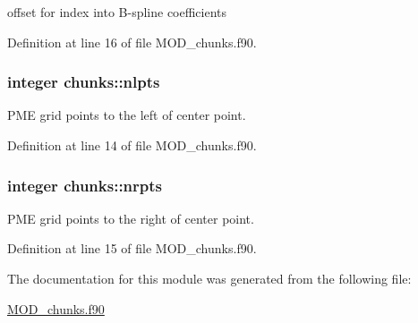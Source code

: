 offset for index into B-\/spline coefficients 



Definition at line 16 of file M\-O\-D\-\_\-chunks.\-f90.

\hypertarget{classchunks_a897713dd9967aaf42ecdcead7f723585}{
\subsubsection[{nlpts}]{\setlength{\rightskip}{0pt plus 5cm}integer chunks\-::nlpts}}\label{classchunks_a897713dd9967aaf42ecdcead7f723585}


P\-M\-E grid points to the left of center point. 



Definition at line 14 of file M\-O\-D\-\_\-chunks.\-f90.

\hypertarget{classchunks_a95c903c94b9a1cc44aba0f942a476c0a}{
\subsubsection[{nrpts}]{\setlength{\rightskip}{0pt plus 5cm}integer chunks\-::nrpts}}\label{classchunks_a95c903c94b9a1cc44aba0f942a476c0a}


P\-M\-E grid points to the right of center point. 



Definition at line 15 of file M\-O\-D\-\_\-chunks.\-f90.



The documentation for this module was generated from the following file\-:\begin{DoxyCompactItemize}
\item 
\hyperlink{MOD__chunks_8f90}{M\-O\-D\-\_\-chunks.\-f90}\end{DoxyCompactItemize}
